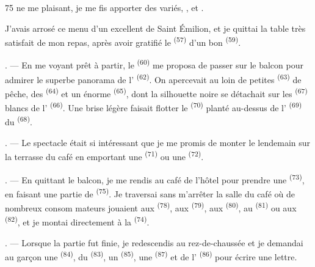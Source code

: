 \begin{VUpage}[77]{75}
\VUcontinue
ne me plaisant, je me fis apporter des \nl
variés, ,  et .

\VUblancAlinea
J'avais arrosé ce menu d'un excellent  de Saint\cc
Émilion, et je quittai la table très satisfait de mon\nl
repas, après avoir gratifié le  \textsuperscript{(57)} d'un bon\nl
{} \textsuperscript{(59)}.

. --- En me voyant prêt à partir, le  \textsuperscript{(60)}\nl
me proposa de passer sur le balcon pour admirer le\nl
superbe panorama de l' \textsuperscript{(62)}. On apercevait au\nl
loin de petites  \textsuperscript{(63)} de pêche, des  \textsuperscript{(64)}\nl
et un énorme  \textsuperscript{(65)}, dont la silhouette noire\nl
se détachait sur les  \textsuperscript{(67)} blancs de l' \textsuperscript{(66)}.\nl
Une brise légère faisait flotter le  \textsuperscript{(70)} planté\nl
au-dessus de l' \textsuperscript{(69)} du  \textsuperscript{(68)}.

. --- Le spectacle était si intéressant que je me\nl
promis de monter le lendemain sur la terrasse du\nl
café en emportant une  \textsuperscript{(71)} ou une \cc
{} \textsuperscript{(72)}.

. --- En quittant le balcon, je me rendis au café\nl
de l'hôtel pour prendre une  \textsuperscript{(73)}, en\nl
faisant une partie de  \textsuperscript{(75)}. Je traversai sans\nl
m'arrêter la salle du café où de nombreux consom\cc
mateurs jouaient aux  \textsuperscript{(78)}, aux  \textsuperscript{(79)},\nl
aux  \textsuperscript{(80)}, au  \textsuperscript{(81)} ou aux  \textsuperscript{(82)},\nl
et je montai directement à la  \textsuperscript{(74)}.

. --- Lorsque la partie fut finie, je redescendis au\nl
rez-de-chaussée et je demandai au garçon une \cc
{} \textsuperscript{(84)}, du  \textsuperscript{(83)}, un  \textsuperscript{(85)}, une\nl
{} \textsuperscript{(87)} et de l' \textsuperscript{(86)} pour écrire une lettre.


\end{VUpage}
